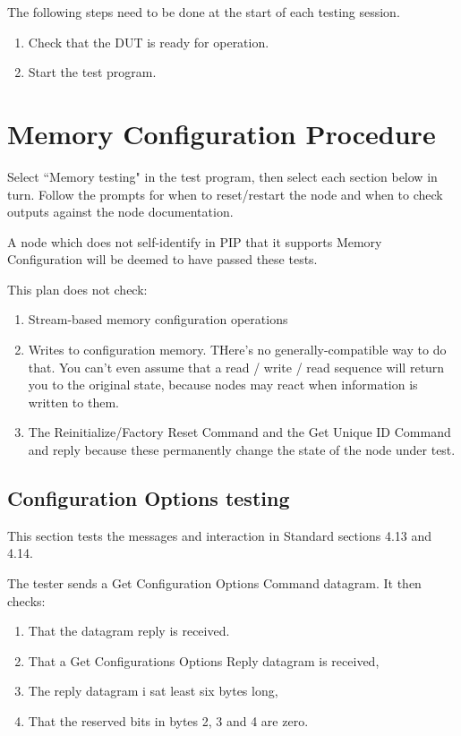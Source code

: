 \documentclass[11pt]{article}
\begin{document}
The following steps need to be done at the start of each testing session.
\begin{enumerate}
\item Check that the DUT is ready for operation.
\item Start the test program.
\end{enumerate}

\section{Memory Configuration Procedure}

Select ``Memory testing" in the test program, 
then select each section below in turn.  Follow the prompts
for when to reset/restart the node and when to check 
outputs against the node documentation.

A node which does not self-identify in PIP that it supports
Memory Configuration will be deemed to have passed these tests.

This plan does not check:
\begin{enumerate}
\item Stream-based memory configuration operations
\item Writes to configuration memory.  THere's no generally-compatible way to do that.
You can't even assume that a read / write / read sequence will return you to the original
state, because nodes may react when information is written to them.
\item The Reinitialize/Factory Reset Command and the Get Unique ID Command and reply
because these permanently change the state of the node under test.
\end{enumerate}

\subsection{Configuration Options testing}

This section tests the messages and interaction in Standard sections 4.13 and 4.14.

The tester sends a Get Configuration Options Command datagram.  It then checks:
\begin{enumerate}
\item That the datagram reply is received.
\item That a Get Configurations Options Reply datagram is received,
\item The reply datagram i sat least six bytes long,
\item That the reserved bits in bytes 2, 3 and 4 are zero.
\end{enumerate}
\end{document}
